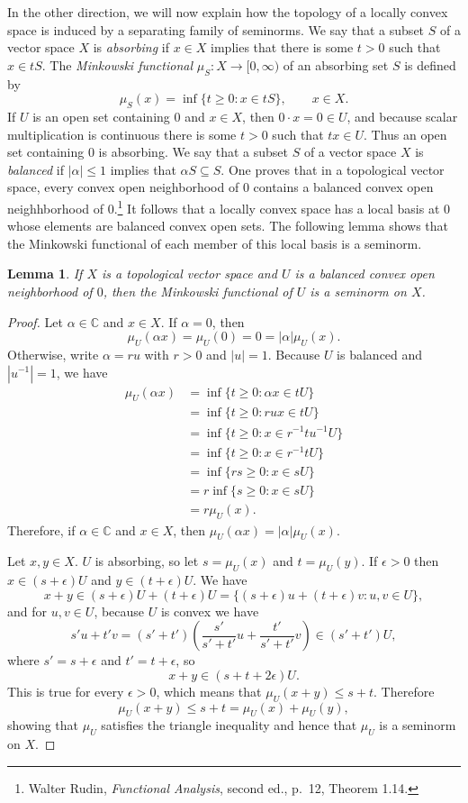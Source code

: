 \documentclass{article}
\newtheorem{lemma}[theorem]{Lemma}
\begin{document}
In the other direction, we will now explain how the topology of a locally convex space is induced by a separating family of seminorms.
We say that a subset $S$ of a vector space $X$ is {\em absorbing} if $x \in X$ implies that there is some $t > 0$ such that $x \in tS$. 
The {\em Minkowski functional} $\mu_S:X \to [0,\infty)$ of an absorbing set $S$ is defined by
\[
\mu_S(x)=\inf\{t  \geq 0: x \in tS\}, \qquad x \in X.
\]
If $U$ is an open set containing $0$ and $x \in X$, then $0\cdot x=0 \in U$, and because scalar multiplication is continuous there is some $t > 0$ such that $tx \in U$. Thus an open set
containing $0$ is absorbing.
We say that  a subset $S$ of a vector space $X$ is {\em balanced} if $|\alpha| \leq 1$ implies that $\alpha S \subseteq S$.
One proves that in a topological vector space, every convex open neighborhood of $0$ contains a balanced convex open neighhborhood of $0$.\footnote{Walter Rudin,
{\em Functional Analysis}, second ed., p.~12, Theorem 1.14.} It follows that a locally convex space has a local basis at $0$ whose elements are balanced convex open sets. 
The following lemma shows that the Minkowski functional of each member of this local basis is a seminorm.

\begin{lemma}
If $X$ is a topological vector space and 
 $U$ is a balanced convex open neighborhood of  $0$, then the Minkowski functional of $U$ is a seminorm on $X$.
\end{lemma}
\begin{proof}
Let $\alpha \in \mathbb{C}$ and $x \in X$. If $\alpha = 0$, then
\[
\mu_U(\alpha x)= \mu_U(0)=0  = |\alpha| \mu_U(x).
\]
Otherwise, write $\alpha = ru$ with $r>0$ and $|u|=1$. 
Because $U$ is balanced and $|u^{-1}|=1$, we have
\begin{align*}
\mu_U(\alpha x)& = \inf\{t \geq 0: \alpha x \in tU\}\\
&=\inf\{t \geq 0: rux \in tU\}\\
&=\inf\{t \geq 0: x \in r^{-1}t u^{-1} U\}\\
&=\inf\{t \geq 0: x \in r^{-1}t U\}\\
&=\inf\{rs \geq 0: x \in sU\}\\
&=r \inf\{s \geq 0: x \in sU\}\\
&=r\mu_U(x).
\end{align*}
Therefore, if $\alpha \in \mathbb{C}$ and $x \in X$, then $\mu_U(\alpha x)=|\alpha| \mu_U(x)$.

Let $x,y \in X$. $U$ is absorbing, so let $s=\mu_U(x)$ and $t = \mu_U(y)$. If $\epsilon>0$ then
$x \in (s+\epsilon)U$ and $y \in (t+\epsilon)U$. 
We have
\[
x+y \in (s+\epsilon)U + (t+\epsilon)U = \{(s+\epsilon)u + (t+\epsilon)v: u,v \in U\},
\]
and for $u,v \in U$, because $U$ is convex we have
\[
s'u+t'v = (s'+t') \left( \frac{s'}{s'+t'}u + \frac{t'}{s'+t'}v \right)  \in (s'+t')U,
\]
where $s'=s+\epsilon$ and $t' = t+\epsilon$,
so
\[
x+y \in (s+t+2\epsilon)U.
\]
This is true for every $\epsilon>0$, which means that $\mu_U(x+y) \leq s+t$. Therefore
\[
\mu_U(x+y) \leq s+t = \mu_U(x)+\mu_U(y),
\]
showing that $\mu_U$ satisfies the triangle inequality and hence that $\mu_U$ is a seminorm on $X$.
\end{proof}
\end{document}
